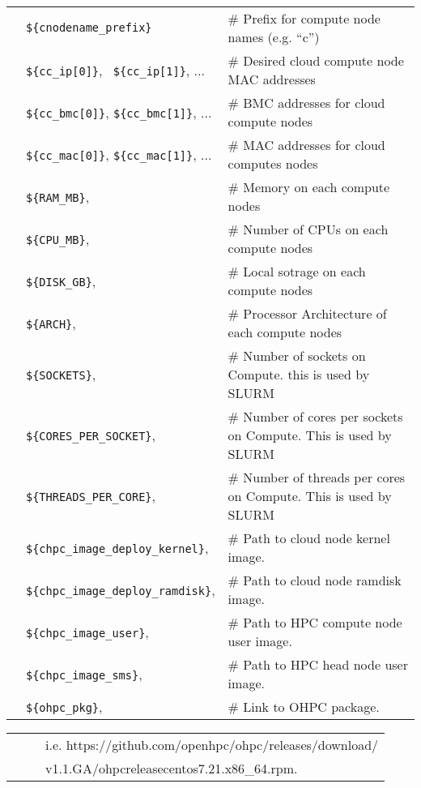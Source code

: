 \begin{tabular}{@{}>{\textbullet}l p{5.5cm} l}
& \texttt{\$\{cnodename\_prefix\}} & {\small \# Prefix for compute node names (e.g. ``c'')} \\
& \texttt{\$\{cc\_ip[0]\}}, \, \texttt{\$\{cc\_ip[1]\}}, ... & {\small \# Desired cloud compute node MAC addresses} \\
& \texttt{\$\{cc\_bmc[0]\}}, \texttt{\$\{cc\_bmc[1]\}}, ... & {\small \# BMC addresses for cloud compute nodes} \\
& \texttt{\$\{cc\_mac[0]\}}, \texttt{\$\{cc\_mac[1]\}}, ... & {\small \# MAC addresses for cloud computes nodes} \\
& \texttt{\$\{RAM\_MB\}}, & {\small \# Memory on each compute nodes} \\
& \texttt{\$\{CPU\_MB\}}, & {\small \# Number of CPUs on each compute nodes} \\
& \texttt{\$\{DISK\_GB\}}, & {\small \# Local sotrage on each compute nodes} \\
& \texttt{\$\{ARCH\}}, & {\small \# Processor Architecture of each compute nodes} \\
& \texttt{\$\{SOCKETS\}}, & {\small \# Number of sockets  on Compute. this is used by SLURM} \\
& \texttt{\$\{CORES\_PER\_SOCKET\}}, & {\small \# Number of cores per sockets  on Compute. This is used by SLURM} \\
& \texttt{\$\{THREADS\_PER\_CORE\}}, & {\small \# Number of threads per cores on Compute. This is used by SLURM} \\
& \texttt{\$\{chpc\_image\_deploy\_kernel\}}, & {\small \# Path to cloud node kernel image. } \\
& \texttt{\$\{chpc\_image\_deploy\_ramdisk\}}, & {\small \# Path to cloud node ramdisk image. } \\
& \texttt{\$\{chpc\_image\_user\}}, & {\small \# Path to HPC compute node user image. } \\
& \texttt{\$\{chpc\_image\_sms\}}, & {\small \# Path to HPC head node user image. } \\
& \texttt{\$\{ohpc\_pkg\}}, & {\small \# Link to OHPC package.  } \\
\end{tabular}
\begin{tabular}{@{}>{}l p{7cm} l}
& \texttt{} & {\small \ 	i.e. https://github.com/openhpc/ohpc/releases/download/ } \\
& \texttt{} & {\small \ 	v1.1.GA/ohpc\-release\-centos7.2\-1.1\-1.x86\_64.rpm. } \\
\end{tabular}

